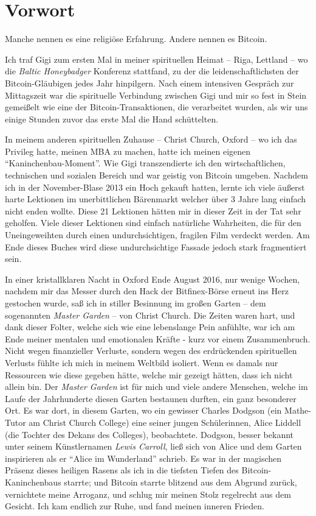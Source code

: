 \chapter*{Vorwort}

Manche nennen es eine religiöse Erfahrung. Andere nennen es Bitcoin.

Ich traf Gigi zum ersten Mal in meiner spirituellen Heimat -- Riga, Lettland --
wo die \textit{Baltic Honeybadger} Konferenz stattfand, zu der die
leidenschaftlichsten der Bitcoin-Gläubigen jedes Jahr hinpilgern. Nach einem
intensiven Gespräch zur Mittagszeit war die spirituelle Verbindung zwischen Gigi
und mir so fest in Stein gemeißelt wie eine der Bitcoin-Transaktionen, die
verarbeitet wurden, als wir uns einige Stunden zuvor das erste Mal die Hand
schüttelten.

In meinem anderen spirituellen Zuhause -- Christ Church, Oxford -- wo ich das
Privileg hatte, meinen MBA zu machen, hatte ich meinen eigenen
\enquote{Kaninchenbau-Moment}. Wie Gigi transzendierte ich den wirtschaftlichen,
technischen und sozialen Bereich und war geistig von Bitcoin umgeben. Nachdem
ich in der November-Blase 2013 ein Hoch gekauft hatten, lernte ich viele äußerst
harte Lektionen im unerbittlichen Bärenmarkt welcher über 3 Jahre lang einfach
nicht enden wollte. Diese 21 Lektionen hätten mir in dieser Zeit in der Tat sehr
geholfen. Viele dieser Lektionen sind einfach natürliche Wahrheiten, die für den
Uneingeweihten durch einen undurchsichtigen, fragilen Film verdeckt werden. Am
Ende dieses Buches wird diese undurchsichtige Fassade jedoch stark fragmentiert
sein.

In einer kristallklaren Nacht in Oxford Ende August 2016, nur wenige Wochen,
nachdem mir das Messer durch den Hack der Bitfinex-Börse erneut ins Herz
gestochen wurde, saß ich in stiller Besinnung im großen Garten -- dem
sogenannten \textit{Master Garden} -- von Christ Church. Die Zeiten waren hart,
und dank dieser Folter, welche sich wie eine lebenslange Pein anfühlte, war ich
am Ende meiner mentalen und emotionalen Kräfte - kurz vor einem Zusammenbruch.
Nicht wegen finanzieller Verluste, sondern wegen des erdrückenden spirituellen
Verlusts fühlte ich mich in meinem Weltbild isoliert. Wenn es damals nur
Ressourcen wie diese gegeben hätte, welche mir gezeigt hätten, dass ich nicht
allein bin. Der \textit{Master Garden} ist für mich und viele andere Menschen,
welche im Laufe der Jahrhunderte diesen Garten bestaunen durften, ein ganz
besonderer Ort. Es war dort, in diesem Garten, wo ein gewisser Charles Dodgson
(ein Mathe-Tutor am Christ Church College) eine seiner jungen Schülerinnen,
Alice Liddell (die Tochter des Dekans des Colleges), beobachtete. Dodgson,
besser bekannt unter seinem Künstlernamen \textit{Lewis Carroll}, ließ sich von
Alice und dem Garten inspirieren als er \enquote{Alice im Wunderland} schrieb.
Es war in der magischen Präsenz dieses heiligen Rasens als ich in die tiefsten
Tiefen des Bitcoin-Kaninchenbaus starrte; und Bitcoin starrte blitzend aus dem
Abgrund zurück, vernichtete meine Arroganz, und schlug mir meinen Stolz
regelrecht aus dem Gesicht. Ich kam endlich zur Ruhe, und fand meinen inneren
Frieden.

